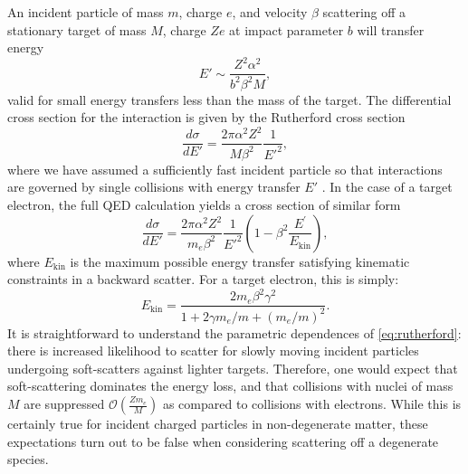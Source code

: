 \documentclass[twocolumn,showpacs,preprintnumbers,amsmath,amssymb,prd]{revtex4}
\newcommand{\OO}{\mathcal{O}}
\def\r{\right)}
\def\l{\left(}
\begin{document}
\begin{appendices}
An incident particle of mass $m$, charge $e$, and velocity $\beta$ scattering off a stationary target of mass $M$, charge $Ze$ at impact parameter $b$ will transfer energy
\begin{equation}
\label{eq:impact}
E' \sim \frac{Z^2 \alpha^2}{b^2 \beta ^2 M},
\end{equation}
valid for small energy transfers less than the mass of the target. 
The differential cross section for the interaction is given by the Rutherford cross section
\begin{equation}
\label{eq:rutherford}
\frac{d \sigma}{dE'} = \frac{2 \pi  \alpha^2 Z^2}{M \beta^2} \frac{1}{E'^2},
\end{equation}
where we have assumed a sufficiently fast incident particle so that interactions are governed by single collisions with energy transfer $E'$ \cite{Agashe:2014kda}.
In the case of a target electron, the full QED calculation yields a cross section of similar form
\begin{equation}
\frac{d \sigma}{dE'} = \frac{2 \pi  \alpha^2 Z^2}{m_e \beta^2} \frac{1}{E'^2} \l1-\beta^2 \frac{E^\prime}{E_\text{kin}} \r,
\end{equation}
where $E_\text{kin}$ is the maximum possible energy transfer satisfying kinematic constraints in a backward scatter. For a target electron, this is simply:
\begin{equation}
\label{eq:Ekin}
E_{\text{kin}} = \frac{2 m_e \beta^2 \gamma^2}{1+ 2\gamma m_e/m +(m_e/m)^2}.
\end{equation}
It is straightforward to understand the parametric dependences of \eqref{eq:rutherford}: there is increased likelihood to scatter for slowly moving incident particles undergoing soft-scatters against lighter targets.
Therefore, one would expect that soft-scattering dominates the energy loss, and that collisions with nuclei of mass $M$ are suppressed $\OO\l\frac{Z m_e}{M}\r$ as compared to collisions with electrons.
While this is certainly true for incident charged particles in non-degenerate matter, these expectations turn out to be false when considering scattering off a degenerate species.


\end{appendices}
\end{document}
